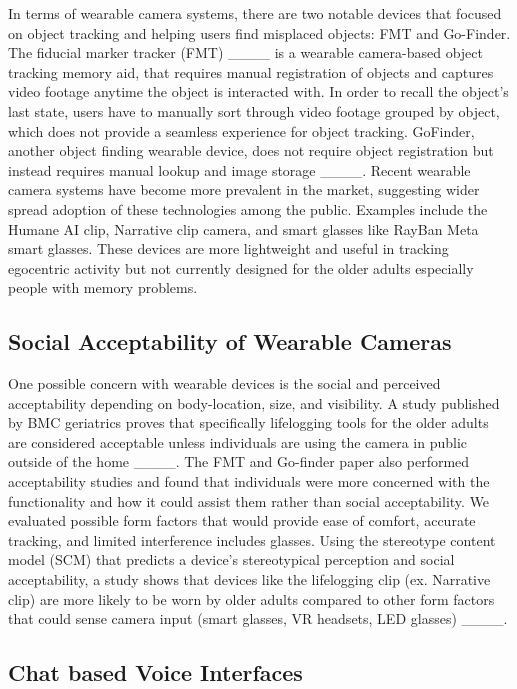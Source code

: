 In terms of wearable camera systems, there are two notable devices that focused on object tracking and helping users find misplaced objects: FMT and Go-Finder. The fiducial marker tracker (FMT) ____ is a wearable camera-based object tracking memory aid, that requires manual registration of objects and captures video footage anytime the object is interacted with. In order to recall the object's last state, users have to manually sort through video footage grouped by object, which does not provide a seamless experience for object tracking. GoFinder, another object finding wearable device, does not require object registration but instead requires manual lookup and image storage ____. Recent wearable camera systems have become more prevalent in the market, suggesting wider spread adoption of these technologies among the public. Examples include the Humane AI clip, Narrative clip camera, and smart glasses like RayBan Meta smart glasses. These devices are more lightweight and useful in tracking egocentric activity but not currently designed for the older adults especially people with memory problems.  

\subsection{Social Acceptability of Wearable Cameras}

One possible concern with wearable devices is the social and perceived acceptability depending on body-location, size, and visibility. A study published by BMC geriatrics proves that specifically lifelogging tools for the older adults are considered acceptable unless individuals are using the camera in public outside of the home ____. The FMT and Go-finder paper also performed acceptability studies and found that individuals were more concerned with the functionality and how it could assist them rather than social acceptability. We evaluated possible form factors that would provide ease of comfort, accurate tracking, and limited interference includes glasses. Using the stereotype content model (SCM) that predicts a device's stereotypical perception and social acceptability, a study shows that devices like the lifelogging clip (ex. Narrative clip) are more likely to be worn by older adults compared to other form factors that could sense camera input (smart glasses, VR headsets, LED glasses) ____.


\subsection{Chat based Voice Interfaces}

